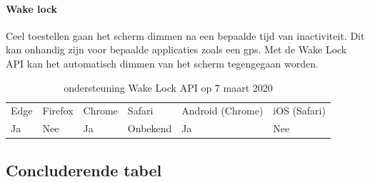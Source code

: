 	
	\paragraph{Wake lock }
	Ceel toestellen gaan het scherm dimmen na een bepaalde tijd van inactiviteit. Dit kan onhandig zijn voor bepaalde applicaties zoals een gps. Met de Wake Lock API \autocite{Bogdanovich2017} kan het automatisch dimmen van het scherm tegengegaan worden.
	
	\begin{table}[H]
		\centering
		\begin{tabular}{llllll}
			Edge & Firefox & Chrome & Safari & Android (Chrome) & iOS (Safari) \\
			Ja   & Nee      &  Ja   & Onbekend     & Ja               & Nee          
		\end{tabular}	
		\caption{ondersteuning  Wake Lock API op 7 maart 2020 }
	\end{table}
	
	\newpage
	\subsection{Concluderende tabel}
	
